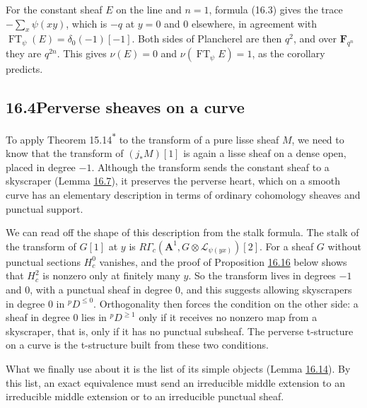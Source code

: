 \documentclass[11pt]{article}
\newcommand{\bpout}[1]{#1\textsuperscript{\hyperlink{bp-outside}{\ensuremath{\ast}}}}
\begin{document}
\label{bp28}%
For the constant sheaf \(E\) on the line and \(n=1\), formula (16.3) gives the trace \(-\sum_x\psi(xy)\), which is \(-q\) at \(y=0\) and \(0\) elsewhere, in agreement with \(\operatorname{FT}_\psi(E)=\delta_0(-1)[-1]\). Both sides of Plancherel are then \(q^2\), and over \(\mathbf F_{q^n}\) they are \(q^{2n}\). This gives \(\nu(E)=0\) and \(\nu(\operatorname{FT}_\psi E)=1\), as the corollary predicts.


\subsection*{\texorpdfstring{16.4\quad Perverse sheaves on a curve}{16.4 Perverse sheaves on a curve}}
\label{bp29}%
\label{bp30}%
To apply Theorem \bpout{15.14} to the transform of a pure lisse sheaf \(M\), we need to know that the transform of \((j_*M)[1]\) is again a lisse sheaf on a dense open, placed in degree \(-1\). Although the transform sends the constant sheaf to a skyscraper (Lemma \hyperref[bp22]{16.7}), it preserves the perverse heart, which on a smooth curve has an elementary description in terms of ordinary cohomology sheaves and punctual support.

We can read off the shape of this description from the stalk formula. The stalk of the transform of \(G[1]\) at \(y\) is \(R\Gamma_c(\mathbf A^1,G\otimes\mathcal L_{\psi(yx)})[2]\). For a sheaf \(G\) without punctual sections \(H^0_c\) vanishes, and the proof of Proposition \hyperref[bp48]{16.16} below shows that \(H^2_c\) is nonzero only at finitely many \(y\). So the transform lives in degrees \(-1\) and \(0\), with a punctual sheaf in degree \(0\), and this suggests allowing skyscrapers in degree \(0\) in \({}^pD^{\le0}\). Orthogonality then forces the condition on the other side: a sheaf in degree \(0\) lies in \({}^pD^{\ge1}\) only if it receives no nonzero map from a skyscraper, that is, only if it has no punctual subsheaf. The perverse t-structure on a curve is the t-structure built from these two conditions.

What we finally use about it is the list of its simple objects (Lemma \hyperref[bp43]{16.14}). By this list, an exact equivalence must send an irreducible middle extension to an irreducible middle extension or to an irreducible punctual sheaf.
\end{document}
